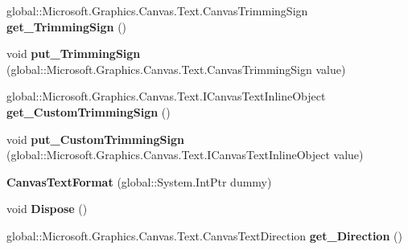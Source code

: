 \begin{DoxyCompactItemize}
global\+::\+Microsoft.\+Graphics.\+Canvas.\+Text.\+Canvas\+Trimming\+Sign {\bfseries get\+\_\+\+Trimming\+Sign} ()
\item 
\mbox{\label{class_microsoft_1_1_graphics_1_1_canvas_1_1_text_1_1_canvas_text_format_a8066e8fae4c8e5707dfa8324ea7faf5b}} 
void {\bfseries put\+\_\+\+Trimming\+Sign} (global\+::\+Microsoft.\+Graphics.\+Canvas.\+Text.\+Canvas\+Trimming\+Sign value)
\item 
\mbox{\label{class_microsoft_1_1_graphics_1_1_canvas_1_1_text_1_1_canvas_text_format_a50e09efee298194e2e557308c2a13012}} 
global\+::\+Microsoft.\+Graphics.\+Canvas.\+Text.\+I\+Canvas\+Text\+Inline\+Object {\bfseries get\+\_\+\+Custom\+Trimming\+Sign} ()
\item 
\mbox{\label{class_microsoft_1_1_graphics_1_1_canvas_1_1_text_1_1_canvas_text_format_a28ea164db75b0d1e4f012001370dc6f8}} 
void {\bfseries put\+\_\+\+Custom\+Trimming\+Sign} (global\+::\+Microsoft.\+Graphics.\+Canvas.\+Text.\+I\+Canvas\+Text\+Inline\+Object value)
\item 
\mbox{\label{class_microsoft_1_1_graphics_1_1_canvas_1_1_text_1_1_canvas_text_format_a8cbafb823def969fc2ed24c98d5016f7}} 
{\bfseries Canvas\+Text\+Format} (global\+::\+System.\+Int\+Ptr dummy)
\item 
\mbox{\label{class_microsoft_1_1_graphics_1_1_canvas_1_1_text_1_1_canvas_text_format_a174c6d766e1732425a63a7ee7ca6a9bb}} 
void {\bfseries Dispose} ()
\item 
\mbox{\label{class_microsoft_1_1_graphics_1_1_canvas_1_1_text_1_1_canvas_text_format_a47023dedd64cd980189d5fc8fe614629}} 
global\+::\+Microsoft.\+Graphics.\+Canvas.\+Text.\+Canvas\+Text\+Direction {\bfseries get\+\_\+\+Direction} ()
\item 
\mbox{\label{class_microsoft_1_1_graphics_1_1_canvas_1_1_text_1_1_canvas_text_format_a345d3dff62bda0ba2440e40e7a5abbc6}} 

\end{DoxyCompactItemize}
